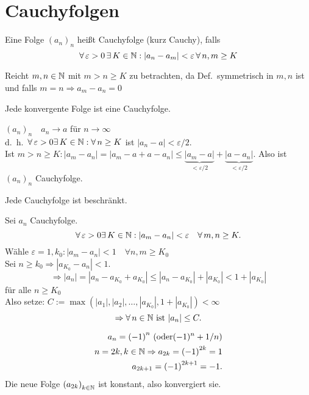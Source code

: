 \documentclass[../ana1.tex]{subfiles}
\begin{document}
\setcounter{section}{8}

\section{Cauchyfolgen}
\begin{defi}[Cauchyfolge]
	Eine Folge \({(a_n)}_n\) heißt Cauchyfolge (kurz Cauchy), falls
	\[\forall \varepsilon > 0 \,\exists K\in\N: |a_n-a_m| < \varepsilon \, \forall n,m\geq K \]
\end{defi}
\begin{bem}
	Reicht \(m,n\in\mathbb{N} \) mit \( m>n\geq K \) zu betrachten, da Def.\ symmetrisch in \(m,n\) ist und falls \(m=n \Rightarrow a_m-a_n=0\)
\end{bem}
\begin{lem}
	Jede konvergente Folge ist eine Cauchyfolge.
\end{lem}
\begin{bew}
	\( {(a_n)}_n \quad a_n \rightarrow a \) für \(n\rightarrow\infty \) \\
	d.\ h.\  \( \forall \varepsilon > 0 \exists K \in \N: \forall n\geq K \) ist \( |a_n-a| < \varepsilon/2 \).\\
	Ist \(m>n\geq K: |a_m -a_n| = |a_m-a+a-a_n| \leq \underbrace{|a_m-a|}_{<\varepsilon/2} + \underbrace{ |a-a_n| }_{<\varepsilon/2}. \) Also ist \({(a_n)}_n\) Cauchyfolge.
\end{bew}
\begin{lem}
	Jede Cauchyfolge ist beschränkt.
\end{lem}
\begin{bew}
	Sei \(a_n\) Cauchyfolge. 
	\[ \forall \varepsilon > 0 \exists K\in\N:|a_m-a_n| < \varepsilon \quad \forall m,n\geq K. \]
	Wähle \(\varepsilon = 1, k_0: |a_m-a_n| < 1 \quad \forall n,m\geq K_0 \) \\
	Sei \(n \geq k_0 \Rightarrow |a_{K_0} - a_n| < 1. \)
	\[ \Rightarrow |a_n| = |a_n - a_{K_0} + a_{K_0}| \leq |a_n - a_{K_0}| + |a_{K_0}| < 1 + |a_{K_0}| \] für alle \(n\geq K_0\) \\
	Also setze: \( C := \max ( |a_1|,|a_2|,\ldots,|a_{K_0}|,1+|a_{K_0}| ) < \infty \) 
	\[ \Rightarrow \forall n\in\N \text{ ist } |a_n| \leq C. \]
\end{bew}
\begin{bsp}
	\begin{align*}
		a_n = {(-1)}^n \text{ (oder} (-1)^n + 1/n \text{)} \\
		n = 2k, k\in\mathbb{N} \Rightarrow a_{2k} = {(-1)}^{2k} = 1 \\
		a_{2k+1} = {(-1)}^{2k+1} = -1.
	\end{align*}
	Die neue Folge \( {(a_{2k})}_{k\in\mathbb{N}} \) ist konstant, also konvergiert sie.
\end{bsp}
\end{document}
